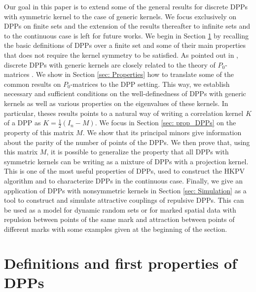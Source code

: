 \documentclass{article}
\numberwithin{equation}{section}
\theoremstyle{plain}
\begin{document}
Our goal in this paper is to extend some of the general results for discrete DPPs with symmetric kernel to the case of generic kernels. We focus exclusively on DPPs on finite sets and the extension of the results thereafter to infinite sets and to the continuous case is left for future works. We begin in Section \ref{sec: Def} by recalling the basic definitions of DPPs over a finite set and some of their main properties that does not require the kernel symmetry to be satisfied. As pointed out in \cite{Brunel18, Gartrell, Han}, discrete DPPs with generic kernels are closely related to the theory of $P_0$-matrices \cite{Johnson20}. We show in Section \ref{sec: Properties} how to translate some of the common results on $P_0$-matrices to the DPP setting. This way, we establish necessary and sufficient conditions on the well-definedness of DPPs with generic kernels as well as various properties on the eigenvalues of these kernels. In particular, theses results points to a natural way of writing a correlation kernel $K$ of a DPP as $K=\frac{1}{2}(I_n - M)$. We focus in Section \ref{sec: prop_DPPs} on the property of this matrix $M$. We show that its principal minors give information about the parity of the number of points of the DPPs. We then prove that, using this matrix $M$, it is possible to generalize the property that all DPPs with symmetric kernels can be writing as a mixture of DPPs with a projection kernel. This is one of the most useful properties of DPPs, used to construct the HKPV algorithm \cite[Algorithm 4.4.2]{Hough} and to characterize DPPs in the continuous case. Finally, we give an application of DPPs with nonsymmetric kernels in Section \ref{sec: Simulation} as a tool to construct and simulate attractive couplings of repulsive DPPs. This can be used as a model for dynamic random sets \cite{Gourieroux} or for marked spatial data with repulsion between points of the same mark and attraction between points of different marks with some examples given at the beginning of the section.

\section{Definitions and first properties of DPPs}\label{sec: Def}
\end{document}
